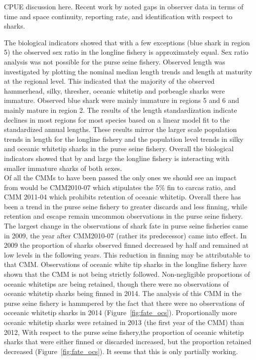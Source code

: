 \documentclass[12pt]{SCreport}
\begin{document}
CPUE discussion here. Recent work by \citet{Clarke2011_a} noted gaps in observer data in terms of time and  space continuity, reporting rate, and identification with respect to sharks.


The biological indicators showed that with a few exceptions (blue shark in region 5) the observed sex ratio in the longline fishery is approximately equal. Sex ratio analysis was not possible for the purse seine fishery. Observed length was investigated by plotting the nominal median length trends and length at maturity at the regional level. This indicated that the majority of the observed hammerhead, silky, thresher, oceanic whitetip and porbeagle sharks were immature. Observed blue shark were mainly immature in regions 5 and 6 and mainly mature in region 2. The results of the length standardization indicate declines in most regions for most species based on a linear model fit to the standardized annual lengths. These results mirror the larger scale population trends in length
for the longline fishery and the population level trends in silky and oceanic whitetip sharks in the purse seine fishery. Overall the biological indicators showed that by and large the longline fishery is interacting with smaller immature sharks of both sexes.
%
%
%
\\
Of all the CMMs to have been passed the only ones we should see an impact from would be CMM2010-07 which stipulates the 5\% fin to carcas ratio, and CMM 2011-04 which prohibits retention of oceanic whitetip. 
Overall there has been a trend in the purse seine fishery to greater discards and less finning, while retention and escape remain  uncommon observations in the purse seine fishery.
The largest change in the observations of shark fate in purse seine fisheries came in 2009, the year after CMM2010-07 (rather its predecessor) came into effect.  In 2009 the proportion of sharks observed finned decreased by half and remained at low levels in the following years.  This reduction in finning may be attributable to that CMM.   
Observations of  oceanic white tip sharks in the  longline  fishery have shown that the CMM is not being strictly followed. 
Non-negligible proportions of oceanic whitetips are being retained, though there were no observations of oceanic whitetip sharks being finned in 2014.  The analysis of this CMM in the purse seine fishery is hammpered by the fact that there were no observations of occeanic whitetip sharks in 2014  (Figure~\ref{fig:fate_ocs}).  
Proportionally  more oceanic whitetip sharks were retained in 2013 (the first year of the CMM) than 2012,   With respect to the purse seine fishery,the proportion of oceanic whitetip sharks that were either finned or discarded increased, but the proportion retained decreased (Figure~\ref{fig:fate_ocs}).  It seems that this is only partially working.
\end{document}
